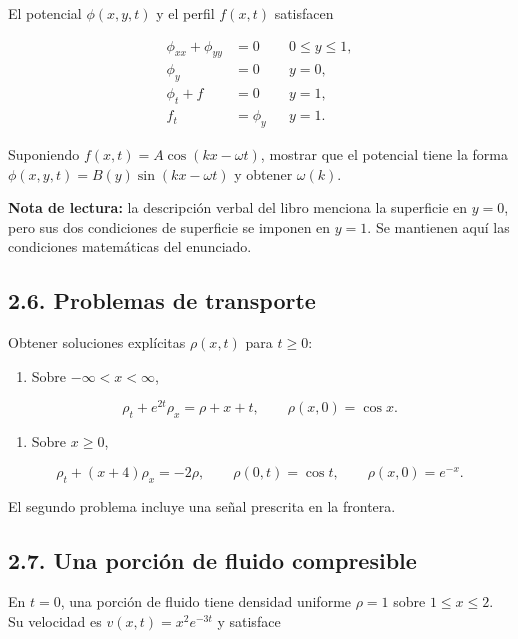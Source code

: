 \documentclass[11pt,a4paper]{article}
\providecommand{\tightlist}{\setlength{\itemsep}{0pt}\setlength{\parskip}{0pt}}
\begin{document}
El potencial \(\phi(x,y,t)\) y el perfil \(f(x,t)\) satisfacen

\[\begin{aligned}
\phi_{xx}+\phi_{yy}&=0&&0\le y\le1,\\
\phi_y&=0&&y=0,\\
\phi_t+f&=0&&y=1,\\
f_t&=\phi_y&&y=1.
\end{aligned}\]

Suponiendo \(f(x,t)=A\cos(kx-\omega t)\), mostrar que el potencial tiene
la forma \(\phi(x,y,t)=B(y)\sin(kx-\omega t)\) y obtener \(\omega(k)\).

\textbf{Nota de lectura:} la descripción verbal del libro menciona la
superficie en \(y=0\), pero sus dos condiciones de superficie se imponen
en \(y=1\). Se mantienen aquí las condiciones matemáticas del enunciado.

\hypertarget{problemas-de-transporte}{%
\subsection{2.6. Problemas de
transporte}\label{problemas-de-transporte}}

Obtener soluciones explícitas \(\rho(x,t)\) para \(t\ge0\):

\begin{enumerate}
\def\labelenumi{(\alph{enumi})}
\tightlist
\item
  Sobre \(-\infty<x<\infty\),
\end{enumerate}

\[\rho_t+e^{2t}\rho_x=\rho+x+t,\qquad \rho(x,0)=\cos x.\]

\begin{enumerate}
\def\labelenumi{(\alph{enumi})}
\setcounter{enumi}{1}
\tightlist
\item
  Sobre \(x\ge0\),
\end{enumerate}

\[\rho_t+(x+4)\rho_x=-2\rho,\qquad \rho(0,t)=\cos t,\qquad \rho(x,0)=e^{-x}.\]

El segundo problema incluye una señal prescrita en la frontera.

\hypertarget{una-porciuxf3n-de-fluido-compresible}{%
\subsection{2.7. Una porción de fluido
compresible}\label{una-porciuxf3n-de-fluido-compresible}}

En \(t=0\), una porción de fluido tiene densidad uniforme \(\rho=1\)
sobre \(1\le x\le2\). Su velocidad es \(v(x,t)=x^2e^{-3t}\) y satisface
\end{document}
